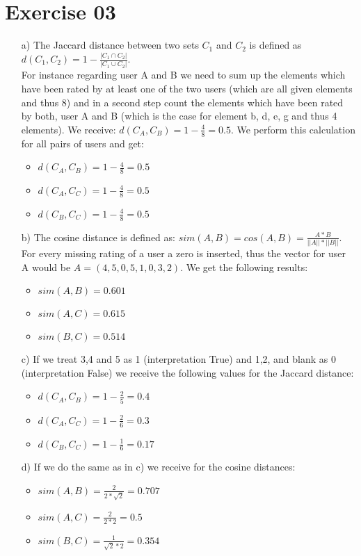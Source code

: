 \documentclass[11pt,a4paper]{scrartcl}
\begin{document}
\section*{Exercise 03}
\begin{itemize}
	\item[a)] The Jaccard distance between two sets $C_1$ and $C_2$ is defined as $d(C_1, C_2) = 1 - \frac{|C_1 \cap C_2| }{|C_1 \cup C_2|}$. \\
	For instance regarding user A and B we need to sum up the elements which have been rated by at least one of the two users (which are all given elements and thus 8) and in a second step count the elements which have been rated by both, user A and B (which is the case for element b, d, e, g and thus 4 elements). We receive: $d(C_A, C_B) = 1 - \frac{4}{8} = 0.5$. We perform this calculation for all pairs of users and get:
	\begin{itemize}
		\item $d(C_A, C_B) = 1 - \frac{4}{8} = 0.5$
		\item $d(C_A, C_C) = 1 - \frac{4}{8} = 0.5$
		\item $d(C_B, C_C) = 1 - \frac{4}{8} = 0.5$
	\end{itemize}

	\item[b)] The cosine distance is defined as: $sim(A,B) = cos(A,B) = \frac{A*B}{||A|| * ||B||}$. For every missing rating of a user a zero is inserted, thus the vector for user A would be $A = (4,5,0,5,1,0,3,2)$. We get the following results:
	\begin{itemize}
		\item $sim(A,B) = 0.601$
		\item $sim(A,C) = 0.615$
		\item $sim(B,C) = 0.514$
	\end{itemize}

	\item[c)] If we treat 3,4 and 5 as 1 (interpretation True) and 1,2, and blank as 0 (interpretation False) we receive the following values for the Jaccard distance:
	\begin{itemize}
		\item $d(C_A, C_B) = 1 - \frac{2}{5} = 0.4$
		\item $d(C_A, C_C) = 1 - \frac{2}{6} = 0.3$
		\item $d(C_B, C_C) = 1 - \frac{1}{6} = 0.17$
	\end{itemize}
	\item[d)] If we do the same as in c) we receive for the cosine distances:
	\begin{itemize}
		\item $sim(A,B) = \frac{2}{2*\sqrt{2}} = 0.707$
		\item $sim(A,C) = \frac{2}{2*2} = 0.5$
		\item $sim(B,C) = \frac{1}{\sqrt{2}*2} = 0.354 $
	\end{itemize}
	

\end{itemize}
\end{document}
